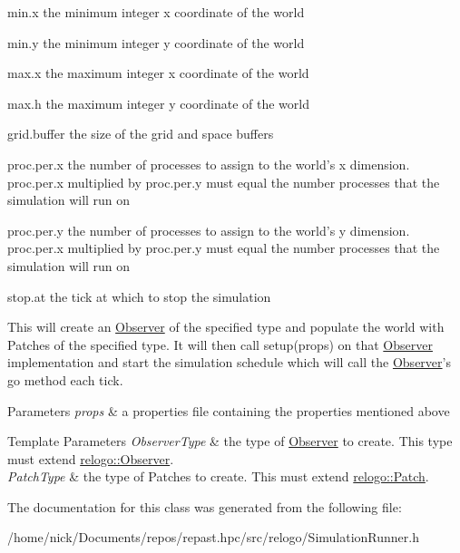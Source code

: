 \begin{DoxyItemize}
\item min.\-x the minimum integer x coordinate of the world 
\item min.\-y the minimum integer y coordinate of the world 
\item max.\-x the maximum integer x coordinate of the world 
\item max.\-h the maximum integer y coordinate of the world 
\item grid.\-buffer the size of the grid and space buffers 
\item proc.\-per.\-x the number of processes to assign to the world's x dimension. proc.\-per.\-x multiplied by proc.\-per.\-y must equal the number processes that the simulation will run on 
\item proc.\-per.\-y the number of processes to assign to the world's y dimension. proc.\-per.\-x multiplied by proc.\-per.\-y must equal the number processes that the simulation will run on 
\item stop.\-at the tick at which to stop the simulation

This will create an \hyperlink{classrepast_1_1relogo_1_1_observer}{Observer} of the specified type and populate the world with Patches of the specified type. It will then call setup(props) on that \hyperlink{classrepast_1_1relogo_1_1_observer}{Observer} implementation and start the simulation schedule which will call the \hyperlink{classrepast_1_1relogo_1_1_observer}{Observer}'s go method each tick.


\begin{DoxyParams}{Parameters}
{\em props} & a properties file containing the properties mentioned above \\
\hline
\end{DoxyParams}

\begin{DoxyTemplParams}{Template Parameters}
{\em Observer\-Type} & the type of \hyperlink{classrepast_1_1relogo_1_1_observer}{Observer} to create. This type must extend \hyperlink{classrepast_1_1relogo_1_1_observer}{relogo\-::\-Observer}. \\
\hline
{\em Patch\-Type} & the type of Patches to create. This must extend \hyperlink{classrepast_1_1relogo_1_1_patch}{relogo\-::\-Patch}. \\
\hline
\end{DoxyTemplParams}

\end{DoxyItemize}

The documentation for this class was generated from the following file\-:\begin{DoxyCompactItemize}
\item 
/home/nick/\-Documents/repos/repast.\-hpc/src/relogo/Simulation\-Runner.\-h\end{DoxyCompactItemize}
